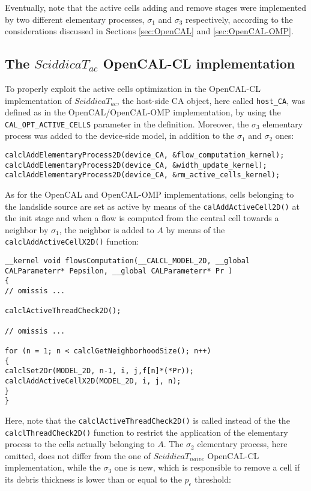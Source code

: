 Eventually, note that the active cells adding and remove stages
were implemented by two different elementary processes, $\sigma_1$
and $\sigma_3$ respectively, according to the considerations
discussed in Sections \ref{sec:OpenCAL} and \ref{sec:OpenCAL-OMP}.

\subsection{The $SciddicaT_{ac}$ OpenCAL-CL implementation}
To properly exploit the active cells optimization in the
OpenCAL-CL implementation of $SciddicaT_{ac}$, the host-side CA
object, here called \verb'host_CA', was defined as in the
OpenCAL/OpenCAL-OMP implementation, by using the
\verb'CAL_OPT_ACTIVE_CELLS' parameter in the definition. Moreover,
the $\sigma_3$ elementary process was added to the device-side
model, in addition to the $\sigma_1$ and $\sigma_2$ ones:

\begin{lstlisting}[basicstyle=\footnotesize, numbers=none]
calclAddElementaryProcess2D(device_CA, &flow_computation_kernel);
calclAddElementaryProcess2D(device_CA, &width_update_kernel);
calclAddElementaryProcess2D(device_CA, &rm_active_cells_kernel);
\end{lstlisting}

\noindent As for the OpenCAL and OpenCAL-OMP implementations,
cells belonging to the landslide source are set as active by means
of the \verb'calAddActiveCell2D()' at the init stage and when a
flow is computed from the central cell towards a neighbor by
$\sigma_1$, the neighbor is added to $A$ by means of the
\verb'calclAddActiveCellX2D()' function:

\begin{lstlisting}[basicstyle=\footnotesize, numbers=none]
__kernel void flowsComputation(__CALCL_MODEL_2D, __global CALParameterr* Pepsilon, __global CALParameterr* Pr )
{
// omissis ...

calclActiveThreadCheck2D();

// omissis ...

for (n = 1; n < calclGetNeighborhoodSize(); n++)
{
calclSet2Dr(MODEL_2D, n-1, i, j,f[n]*(*Pr));
calclAddActiveCellX2D(MODEL_2D, i, j, n);
}
}
\end{lstlisting}

\noindent Here, note that the \verb'calclActiveThreadCheck2D()' is
called instead of the the \verb'calclThreadCheck2D()' function to
restrict the application of the elementary process to the cells
actually belonging to $A$. The $\sigma_2$ elementary process, here
omitted, does not differ from the one of $SciddicaT_{naive}$
OpenCAL-CL implementation, while the $\sigma_3$ one is new, which
is responsible to remove a cell if its debris thickness is lower
than or equal to the $p_\epsilon$ threshold:

